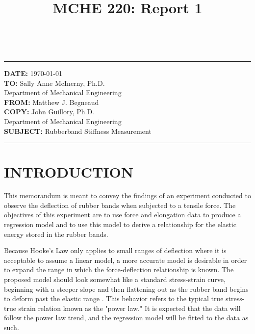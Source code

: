 \documentclass[12pt]{article}
\title{MCHE 220: Report 1}
\begin{document}
\fancyhf{}  
  \renewcommand{\headrulewidth}{0pt}
    \pagestyle{plain}
    
\captionsetup[table]{labelsep=space}

\begin{flushleft}
\hrulefill\\\hrule height 1pt
\vspace{5pt}
\textbf{DATE: }\today
\bigskip\\
\textbf{TO: }Sally Anne McInerny, Ph.D.\\ Department of Mechanical Engineering
\bigskip\\
\textbf{FROM: }Matthew J. Begneaud
\bigskip\\
\textbf{COPY: }John Guillory, Ph.D.\\ Department of Mechanical Engineering
\bigskip\\
\textbf{SUBJECT:} Rubberband Stiffness Measurement
\vspace{-10pt}
\end{flushleft}
\hrulefill \hrule height 1pt


\section*{\fontsize{12}{12}\selectfont INTRODUCTION}
This memorandum is meant to convey the findings of an experiment conducted to observe the deflection of rubber bands when subjected to a tensile force. The objectives of this experiment are to use force and elongation data to produce a regression model and to use this model to derive a relationship for the elastic energy stored in the rubber bands.
\bigskip

Because Hooke's Law only applies to small ranges of deflection where it is acceptable to assume a linear model, a more accurate model is desirable in order to expand the range in which the force-deflection relationship is known. The proposed model should look somewhat like a standard stress-strain curve, beginning with a steeper slope and then flattening out as the rubber band begins to deform past the elastic range \cite{rubberband_writeup}. This behavior refers to the typical true stress-true strain relation known as the "power law." It is expected that the data will follow the power law trend, and the regression model will be fitted to the data as such.
\end{document}
